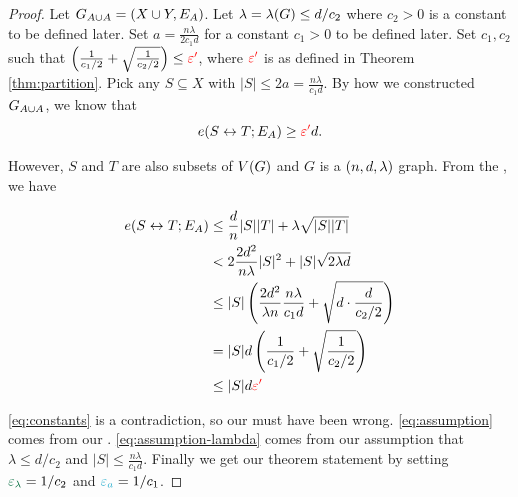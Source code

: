 \documentclass[11pt]{article}
\begin{document}
\begin{proof}
Let $G_{A \cup A} = (X \cup Y, E_A)$. 
Let $\lambda = \lambda(G) \leq d/c_2$ where $c_2 > 0$ is a constant to be defined later.
Set $a = \frac{n\lambda}{2c_1 d}$ for a constant $c_1 > 0$ to be defined later.
Set $c_1, c_2$ such that $\left(\frac{1}{c_1/2}  + \sqrt{\frac{1}{c_2/2}}\right) \leq \textcolor{red}{\varepsilon'}$, where $\textcolor{red}{\varepsilon'}$ is as defined in Theorem \ref{thm:partition}.
Pick any $S \subseteq X$ with $|S| \leq 2a = \frac{n\lambda}{c_1 d}$.
By how we constructed $G_{A \cup A}$, we know that
\[ e(S \leftrightarrow T; E_A) \geq \textcolor{red}{\varepsilon'} d.\]

However, $S$ and $T$ are also subsets of $V(G)$ and $G$ is a $(n, d, \lambda)$ graph.
From the , we have

\begin{align}
	e(S \leftrightarrow T; E_A) &\leq \frac{d}{n}|S||T| + \lambda\sqrt{|S||T|} \\
	&< 2\frac{2d^2}{n\lambda}|S|^2 + |S|\sqrt{2\lambda d} \label{eq:assumption}\\
	&\leq |S|\left(\frac{2d^2}{\lambda n} \frac{n\lambda}{c_1 d} + \sqrt{d\cdot \frac{d}{c_2/2}}\right) \label{eq:assumption-lambda}\\
	&= |S|d\left(\frac{1}{c_1/2}  + \sqrt{\frac{1}{c_2/2}}\right) \\
	&\leq |S|d\textcolor{red}{\varepsilon'} \label{eq:constants}
\end{align}


\eqref{eq:constants} is a contradiction, so our  must have been wrong.
\eqref{eq:assumption} comes from our .
\eqref{eq:assumption-lambda} comes from our assumption that $\lambda \leq d/c_2$ and $|S| \leq \frac{n\lambda}{c_1 d}$.
Finally we get our theorem statement by setting $\epsilonL = 1/c_2$ and $\epsilonA = 1/c_1$.


\end{proof}
\end{document}
